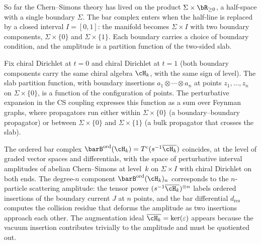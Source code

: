 So far the Chern--Simons theory has lived on the product
$\Sigma \times \bR_{\ge 0}$, a half-space with a single boundary
$\Sigma$. The bar complex enters when the half-line is replaced by
a closed interval $I = [0, 1]$: the manifold becomes
$\Sigma \times I$ with two boundary components,
$\Sigma \times \{0\}$ and $\Sigma \times \{1\}$. Each boundary
carries a choice of boundary condition, and the amplitude is a
partition function of the two-sided slab.

Fix chiral Dirichlet at $t = 0$ and chiral Dirichlet at $t = 1$
(both boundary components carry the same chiral algebra $\cH_k$,
with the same sign of level). The slab partition function, with
boundary insertions
$a_1 \otimes \cdots \otimes a_n$ at points $z_1, \ldots, z_n$ on
$\Sigma \times \{0\}$, is a function of the configuration of
points. The perturbative expansion in the CS coupling expresses
this function as a sum over Feynman graphs, where propagators run
either within $\Sigma \times \{0\}$ (a boundary--boundary
propagator) or between $\Sigma \times \{0\}$ and
$\Sigma \times \{1\}$ (a bulk propagator that crosses the slab).

\begin{heuristic}
\label{heur:cs-hinge-bar-equals-interval}
The ordered bar complex
$\barB^{\mathrm{ord}}(\cH_k) = T^c(s^{-1}\overline{\cH_k})$
coincides, at the level of graded vector spaces and differentials,
with the space of perturbative interval amplitudes of abelian
Chern--Simons at level~$k$ on $\Sigma \times I$ with chiral
Dirichlet on both ends. The degree-$n$ component
$\barB^{\mathrm{ord}}(\cH_k)_n$ corresponds to the
$n$-particle scattering amplitude: the tensor power
$(s^{-1}\overline{\cH_k})^{\otimes n}$ labels ordered insertions
of the boundary current $J$ at $n$ points, and the bar
differential $d_{\mathrm{res}}$ computes the collision residue
that deforms the amplitude as two insertions approach each other.
The augmentation ideal $\overline{\cH_k} = \ker(\varepsilon)$
appears because the vacuum insertion contributes trivially to
the amplitude and must be quotiented out.
\end{heuristic}

